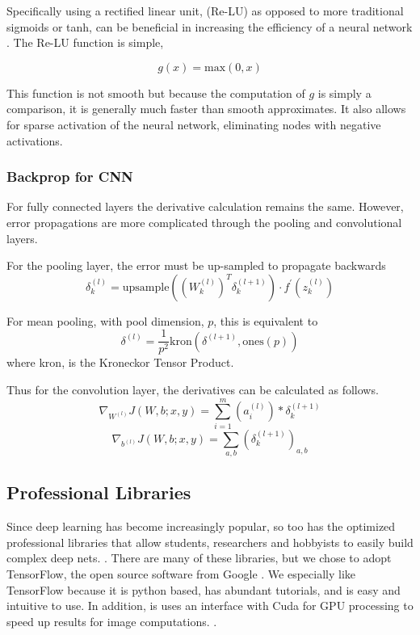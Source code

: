 \documentclass[12pt, twocolumn]{article}
\begin{document}
Specifically using a rectified linear unit, (Re-LU) as opposed to more traditional sigmoids or tanh, can be beneficial in increasing the efficiency of a neural network \cite{imagenet}. The Re-LU function is simple, 

\begin{equation}
g(x)= \textrm{max}(0,x)
\end{equation}

This function is not smooth but because the computation of $g$ is simply a comparison, it is generally much faster than smooth approximates. It also allows for sparse activation of the neural network, eliminating nodes with negative activations. 

\subsubsection{Backprop for CNN}
For fully connected layers  the derivative calculation remains the same. However,  error propagations are more complicated through the pooling and convolutional layers. 

For the pooling layer, the error must be up-sampled to propagate backwards
\begin{equation}
\delta^{(l)}_k=\textrm{upsample}((W^{(l)}_k)^T \delta^{(l+1)}_k) \cdot f^{\prime}(z^{(l)}_k)
\end{equation}


For mean pooling, with pool dimension, $p$, this is equivalent to 
\begin{equation}
\delta^{(l)}= \frac{1}{p^2}  \textrm{kron}(\delta^{(l+1)}, \textrm{ones}(p))
\end{equation}
where kron, is the Kroneckor Tensor Product.

Thus for the convolution layer, the derivatives can be calculated as follows.
\begin{equation}
\nabla_{W^{(l)}}J(W,b;x,y) = \sum_{i=1}^m (a^{(l)}_i) \ast  \delta^{(l+1)}_k
\end{equation}
\begin{equation}
\nabla_{b^{(l)}}J(W,b;x,y)= \sum_{a,b}(\delta^{(l+1)}_k)_{a,b}
\end{equation}


\subsection{Professional Libraries}

Since deep learning has become increasingly popular, so too has the optimized professional libraries that allow students, researchers and hobbyists to easily build complex deep nets. . There are many of these libraries, but we chose to adopt TensorFlow, the open source software from Google \cite{TensorFlowGH}. We especially like TensorFlow because it is python based, has abundant tutorials, and is easy and intuitive to use. In addition, is uses an interface with Cuda for GPU processing to speed up results for image computations. \cite{TensorFlowWeb}. 
\end{document}
